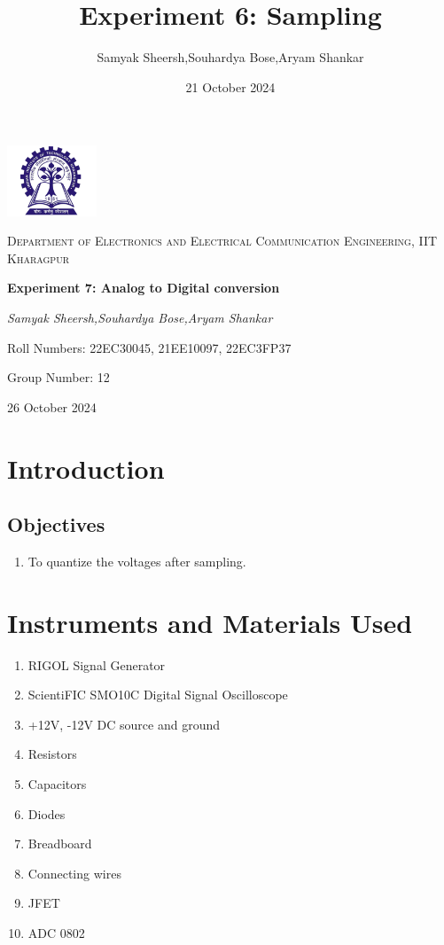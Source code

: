\documentclass{article}
\title{Experiment 6: Sampling}
\author{Samyak Sheersh,Souhardya Bose,Aryam Shankar}
\date{21 October 2024}
\begin{document}
\begin{titlepage}
    \centering
    \includegraphics[width=0.2\textwidth]{KGP_logo.png}\par\vspace{1cm}
    {\scshape\LARGE Department of Electronics and Electrical Communication Engineering, IIT Kharagpur\par}
    \vspace{1cm}
    {\huge\bfseries Experiment 7: Analog to Digital conversion\par}
    \vspace{1.5cm}
    {\Large\itshape Samyak Sheersh,Souhardya Bose,Aryam Shankar\par}
    \vfill
    {\large Roll Numbers: 22EC30045, 21EE10097, 22EC3FP37\par}
    {\large Group Number: 12\par}
    \vfill
    {\large 26 October 2024\par}
\end{titlepage}


\section{Introduction}
\subsection{Objectives}
\begin{enumerate}
  \item To quantize the voltages after sampling.
\end{enumerate}
\section{Instruments and Materials Used}
\begin{enumerate}
  \item RIGOL Signal Generator
  \item ScientiFIC SMO10C Digital Signal Oscilloscope
  \item +12V, -12V DC source and ground
  \item Resistors
  \item Capacitors
  \item Diodes
  \item Breadboard
  \item Connecting wires
  \item JFET
  \item ADC 0802
\end{enumerate}
\end{document}
